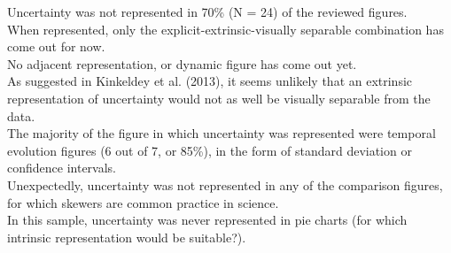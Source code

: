 \documentclass[12pt,a4paper]{article}
\begin{document}
Uncertainty was not represented in 70\% (N = 24) of the reviewed figures.\\
When represented, only the explicit-extrinsic-visually separable combination has come out for now.\\
No adjacent representation, or dynamic figure has come out yet.\\
As suggested in Kinkeldey et al. (2013), it seems unlikely that an extrinsic representation of uncertainty would not as well be visually separable from the data.\\
The majority of the figure in which uncertainty was represented were temporal evolution figures (6 out of 7, or 85\%), in the form of standard deviation or confidence intervals.\\
Unexpectedly, uncertainty was not represented in any of the comparison figures, for which skewers are common practice in science.\\
In this sample, uncertainty was never represented in pie charts (for which intrinsic representation would be suitable?).
\end{document}
